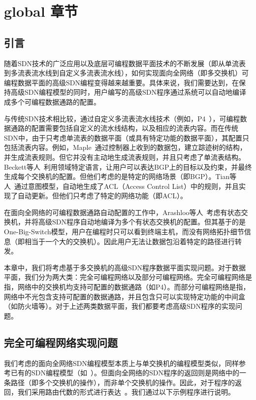 \chapter{global 章节}

\section{引言}

随着SDN技术的广泛应用以及底层可编程数据平面技术的不断发展（即从单流表到多流表流水线到自定义多流表流水线），如何实现面向全网络（即多交换机）可编程数据平面的高级SDN编程变得越来越重要。具体来说，我们需要达到，在保持高级SDN编程模型的同时，用户编写的高级SDN程序通过系统可以自动地编译成多个可编程数据通路的配置。

与传统SDN技术相比较，通过自定义多流表流水线技术（例如，P4~\cite{p4}），可编程数据通路的配置需要包括自定义的流水线结构，以及相应的流表内容。而在传统SDN中，由于只考虑单流表的数据平面（或具有特定功能的数据平面），其配置只包括流表内容。例如，Maple~\cite{voellmy2013maple}通过控制器上收到的数据包，建立踪迹树的结构，并生成流表规则。但它并没有主动地生成流表规则，并且只考虑了单流表结构。Beckett等人~\cite{beckett2016don}利用领域特定语言，让用户可以表达BGP上的目标以及约束，并最终生成每个交换机的配置。但他们考虑的是特定的网络场景（即BGP）。Tian等人~\cite{tian2019safely}通过意图模型，自动地生成了ACL（Access Control List）中的规则，并且实现了自动更新。但他们只考虑了特定的网络功能（即ACL）。

在面向全网络的可编程数据通路自动配置的工作中，Arashloo等人~\cite{snap}考虑有状态交换机，并将高级SDN程序自动地编译为多个有状态交换机的配置。但其基于的是One-Big-Switch模型，用户在编程时只可以看到终端主机，而没有网络拓扑细节信息（即相当于一个大的交换机）。因此用户无法让数据包沿着特定的路径进行转发。

本章中，我们将考虑基于多交换机的高级SDN程序数据平面实现问题。对于数据平面，我们分为两大类：完全可编程网络以及部分可编程网络。完全可编程网络是指，网络中的交换机均支持可配置的数据通路（如P4）。而部分可编程网络是指，网络中不光包含支持可配置的数据通路，并且包含只可以实现特定功能的中间盒（如防火墙等）。对于上述两类数据平面，我们都要考虑高级SDN程序的实现问题。

\section{完全可编程网络实现问题}

我们考虑的面向全网络SDN编程模型本质上与单交换机的编程模型类似，同样参考已有的SDN编程模型（如~\cite{snap,sivaraman2016packet}）。但面向全网络的SDN程序的返回则是网络中的一条路径（即多个交换机的操作），而非单个交换机的操作。因此，对于程序的返回，我们采用路由代数的形式进行表达~\cite{gao2018t}。我们通过以下示例程序进行说明。


